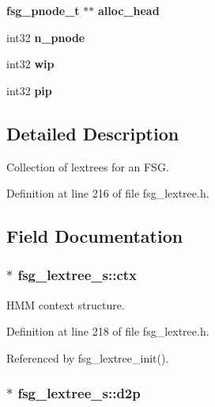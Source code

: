 \begin{DoxyCompactItemize}
\item 
{\bf fsg\-\_\-pnode\-\_\-t} $\ast$$\ast$ {\bfseries alloc\-\_\-head}\label{structfsg__lextree__s_a430605e77e2ad3de2b5e2aa1fb7eb365}

\item 
int32 {\bfseries n\-\_\-pnode}\label{structfsg__lextree__s_ac55755e9f9453acab71a23a5cf3ea542}

\item 
int32 {\bfseries wip}\label{structfsg__lextree__s_a791fcaf2440b7d90796c5e7e50a7b186}

\item 
int32 {\bfseries pip}\label{structfsg__lextree__s_a9e6768eff7003453759b1ade9cb50bc7}

\end{DoxyCompactItemize}


\subsection{Detailed Description}
Collection of lextrees for an F\-S\-G. 

Definition at line 216 of file fsg\-\_\-lextree.\-h.



\subsection{Field Documentation}
\subsubsection[{ctx}]{$\ast$ fsg\-\_\-lextree\-\_\-s\-::ctx}\label{structfsg__lextree__s_afbbd5d59a74dfb287289aa20a9a3979a}


H\-M\-M context structure. 



Definition at line 218 of file fsg\-\_\-lextree.\-h.



Referenced by fsg\-\_\-lextree\-\_\-init().

\subsubsection[{d2p}]{$\ast$ fsg\-\_\-lextree\-\_\-s\-::d2p}\label{structfsg__lextree__s_add12fb7151ebdecb74deaf6aca86d95e}


